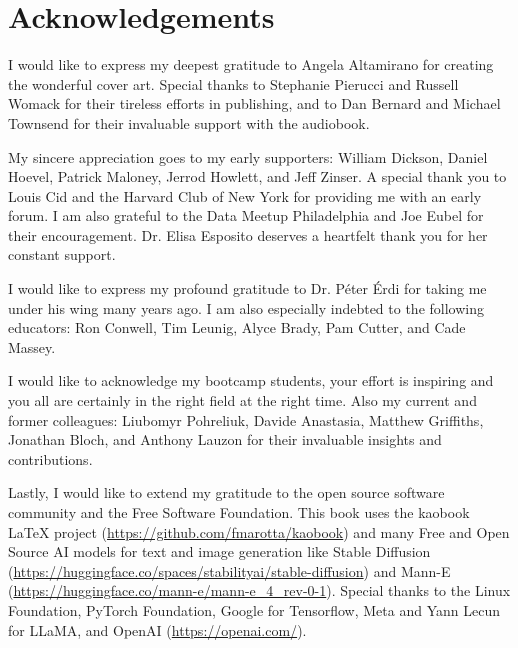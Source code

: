 \let\cleardoublepage\clearpage
\chapter*{Acknowledgements}

I would like to express my deepest gratitude to Angela Altamirano for creating the wonderful cover art. Special thanks to Stephanie Pierucci and Russell Womack for their tireless efforts in publishing, and to Dan Bernard and Michael Townsend for their invaluable support with the audiobook.

My sincere appreciation goes to my early supporters: William Dickson, Daniel Hoevel, Patrick Maloney, Jerrod Howlett, and Jeff Zinser. A special thank you to Louis Cid and the Harvard Club of New York for providing me with an early forum. I am also grateful to the Data Meetup Philadelphia and Joe Eubel for their encouragement. Dr. Elisa Esposito deserves a heartfelt thank you for her constant support.

I would like to express my profound gratitude to Dr. Péter Érdi for taking me under his wing many years ago. I am also especially indebted to the following educators: Ron Conwell, Tim Leunig, Alyce Brady, Pam Cutter, and Cade Massey.

I would like to acknowledge my bootcamp students, your effort is inspiring and you all are certainly in the right field at the right time. Also my current and former colleagues: Liubomyr Pohreliuk, Davide Anastasia, Matthew Griffiths, Jonathan Bloch, and Anthony Lauzon for their invaluable insights and contributions.

Lastly, I would like to extend my gratitude to the open source software community and the Free Software Foundation. This book uses the kaobook LaTeX project (\url{https://github.com/fmarotta/kaobook}) and many Free and Open Source AI models for text and image generation like Stable Diffusion (\url{https://huggingface.co/spaces/stabilityai/stable-diffusion}) and Mann-E (\url{https://huggingface.co/mann-e/mann-e_4_rev-0-1}). Special thanks to the Linux Foundation, PyTorch Foundation, Google for Tensorflow, Meta and Yann Lecun for LLaMA, and OpenAI (\url{https://openai.com/}).

